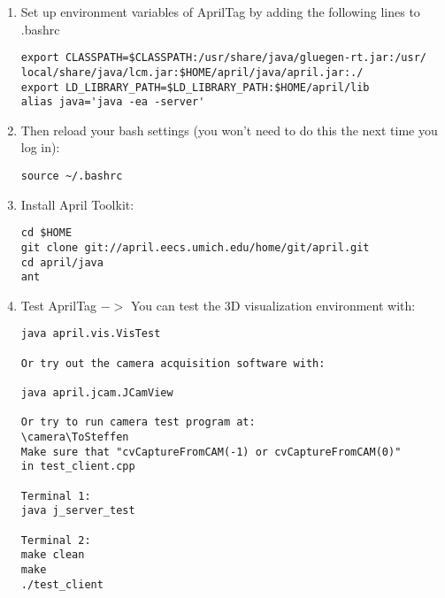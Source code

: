 \begin{enumerate}
\item Set up environment variables of AprilTag by adding the following lines to .bashrc
\begin{lstlisting}
export CLASSPATH=$CLASSPATH:/usr/share/java/gluegen-rt.jar:/usr/
local/share/java/lcm.jar:$HOME/april/java/april.jar:./
export LD_LIBRARY_PATH=$LD_LIBRARY_PATH:$HOME/april/lib
alias java='java -ea -server'
\end{lstlisting}

\item Then reload your bash settings (you won't need to do this the next time you log in):
\begin{lstlisting}
source ~/.bashrc
\end{lstlisting}

\item Install April Toolkit:
\begin{lstlisting}
cd $HOME
git clone git://april.eecs.umich.edu/home/git/april.git
cd april/java
ant
\end{lstlisting}

\item Test AprilTag $->$ You can test the 3D visualization environment with:
\begin{lstlisting}
java april.vis.VisTest

Or try out the camera acquisition software with:

java april.jcam.JCamView

Or try to run camera test program at:
\camera\ToSteffen
Make sure that "cvCaptureFromCAM(-1) or cvCaptureFromCAM(0)"
in test_client.cpp

Terminal 1:
java j_server_test

Terminal 2:
make clean
make
./test_client
\end{lstlisting}

\end{enumerate}

